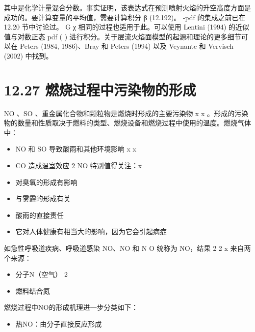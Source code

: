 \documentclass[11pt,a4paper,openany,fontset=none]{ctexbook}
\begin{document}
其中是化学计量混合分数。事实证明，该表达式在预测喷射火焰的升空高度方面是成功的。要计算变量的平均值，需要计算积分 β (12.192)。 -pdf 的集成之前已在 12.20 节中讨论过。 G χ 相同的过程也适用于此。可以使用 Lentini (1994) 的近似值与对数正态 pdf ( ) 进行积分。关于层流火焰面模型的起源和理论的更多细节可以在 Peters (1984, 1986)、Bray 和 Peters (1994) 以及 Veynante 和 Vervisch (2002) 中找到。

\section*{12.27 燃烧过程中污染物的形成}

NO 、SO 、重金属化合物和颗粒物是燃烧时形成的主要污染物 x x 。形成的污染物的数量和性质取决于燃料的类型、燃烧设备和燃烧过程中使用的温度。燃烧气体中：

\begin{itemize}

\item NO 和 SO 导致酸雨和其他环境影响 x x

\item CO 造成温室效应 2 NO 特别值得关注：x

\item 对臭氧的形成有影响

\item 与雾霾的形成有关

\item 酸雨的直接责任

\item 它对人体健康有相当大的影响，因为它会引起病症

\end{itemize}

如急性呼吸道疾病、呼吸道感染
NO、NO 和 N O 统称为 NO，结果 2 2 x 来自两个来源：

\begin{itemize}

\item 分子N（空气） 2

\item 燃料结合氮

\end{itemize}

燃烧过程中NO的形成机理进一步分类如下：

\begin{itemize}

\item 热NO：由分子直接反应形成

\end{itemize}
\end{document}
